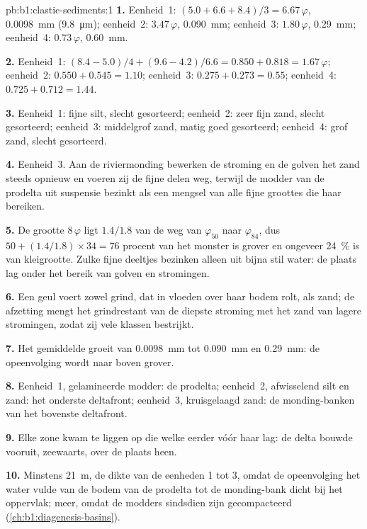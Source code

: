 \begin{solution}{pb:b1:clastic-sediments:1}
\textbf{1.} Eenheid~1: $(5.0 + 6.6 + 8.4)/3 = 6.67\,\varphi$, \qty{0.0098}{mm}
(\qty{9.8}{\micro m}); eenheid~2: $3.47\,\varphi$, \qty{0.090}{mm}; eenheid~3:
$1.80\,\varphi$, \qty{0.29}{mm}; eenheid~4: $0.73\,\varphi$, \qty{0.60}{mm}.

\textbf{2.} Eenheid~1: $(8.4 - 5.0)/4 + (9.6 - 4.2)/6.6 = 0.850 + 0.818 =
1.67\,\varphi$; eenheid~2: $0.550 + 0.545 = 1.10$; eenheid~3: $0.275 + 0.273 = 0.55$;
eenheid~4: $0.725 + 0.712 = 1.44$.

\textbf{3.} Eenheid~1: fijne silt, slecht gesorteerd; eenheid~2: zeer fijn zand, slecht
gesorteerd; eenheid~3: middelgrof zand, matig goed gesorteerd; eenheid~4: grof zand,
slecht gesorteerd.

\textbf{4.} Eenheid~3. Aan de riviermonding bewerken de stroming en de golven het zand
steeds opnieuw en voeren zij de fijne delen weg, terwijl de modder van de prodelta uit
suspensie bezinkt als een mengsel van alle fijne groottes die haar bereiken.

\textbf{5.} De grootte $8\,\varphi$ ligt $1.4/1.8$ van de weg van
$\varphi_{50}$ naar $\varphi_{84}$, dus $50 + (1.4/1.8) \times 34 = 76$ procent van het
monster is grover en ongeveer \qty{24}{\percent} is van kleigrootte. Zulke fijne deeltjes
bezinken alleen uit bijna stil water: de plaats lag onder het bereik van golven en
stromingen.

\textbf{6.} Een geul voert zowel grind, dat in vloeden over haar bodem rolt, als zand; de
afzetting mengt het grindrestant van de diepste stroming met het zand van lagere
stromingen, zodat zij vele klassen bestrijkt.

\textbf{7.} Het gemiddelde groeit van \qty{0.0098}{mm} tot \qty{0.090}{mm} en
\qty{0.29}{mm}: de opeenvolging wordt naar boven grover.

\textbf{8.} Eenheid~1, gelamineerde modder: de prodelta; eenheid~2, afwisselend silt en
zand: het onderste deltafront; eenheid~3, kruisgelaagd zand: de monding-banken van het
bovenste deltafront.

\textbf{9.} Elke zone kwam te liggen op die welke eerder vóór haar lag: de delta bouwde
vooruit, zeewaarts, over de plaats heen.

\textbf{10.} Minstens \qty{21}{m}, de dikte van de eenheden 1 tot 3, omdat de opeenvolging
het water vulde van de bodem van de prodelta tot de monding-bank dicht bij het oppervlak;
meer, omdat de modders sindsdien zijn gecompacteerd
(\cref{ch:b1:diagenesis-basins}).


\end{solution}
